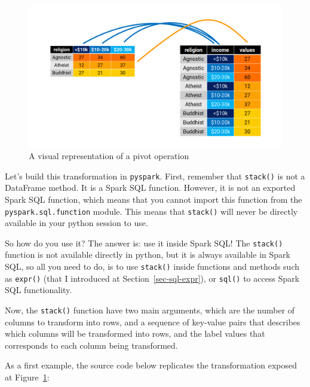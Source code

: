 \documentclass[
  11pt,
  letterpaper,
  DIV=11,
  numbers=noendperiod]{scrreprt}
\begin{document}
\begin{figure}

{\centering \includegraphics{Chapters/./../Figures/pivot1.png}

}

\caption{\label{fig-pivot1}A visual representation of a pivot operation}

\end{figure}

Let's build this transformation in \texttt{pyspark}. First, remember
that \texttt{stack()} is not a DataFrame method. It is a Spark SQL
function. However, it is not an exported Spark SQL function, which means
that you cannot import this function from the
\texttt{pyspark.sql.function} module. This means that \texttt{stack()}
will never be directly available in your python session to use.

So how do you use it? The answer is: use it inside Spark SQL! The
\texttt{stack()} function is not available directly in python, but it is
always available in Spark SQL, so all you need to do, is to use
\texttt{stack()} inside functions and methods such as \texttt{expr()}
(that I introduced at Section~\ref{sec-sql-expr}), or \texttt{sql()} to
access Spark SQL functionality.

Now, the \texttt{stack()} function have two main arguments, which are
the number of columns to transform into rows, and a sequence of
key-value pairs that describes which columns will be transformed into
rows, and the label values that corresponds to each column being
transformed.

As a first example, the source code below replicates the transformation
exposed at Figure~\ref{fig-pivot1}:
\end{document}

